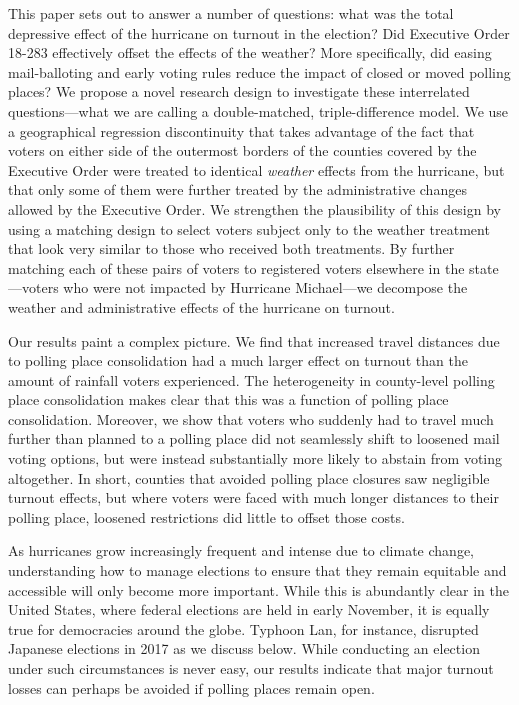 \documentclass[
  12pt,
]{article}
\begin{document}
This paper sets out to answer a number of questions: what was the total depressive effect of the hurricane on turnout in the election? Did Executive Order 18-283 effectively offset the effects of the weather? More specifically, did easing mail-balloting and early voting rules reduce the impact of closed or moved polling places? We propose a novel research design to investigate these interrelated questions---what we are calling a double-matched, triple-difference model. We use a geographical regression discontinuity that takes advantage of the fact that voters on either side of the outermost borders of the counties covered by the Executive Order were treated to identical \emph{weather} effects from the hurricane, but that only some of them were further treated by the administrative changes allowed by the Executive Order. We strengthen the plausibility of this design by using a matching design to select voters subject only to the weather treatment that look very similar to those who received both treatments. By further matching each of these pairs of voters to registered voters elsewhere in the state---voters who were not impacted by Hurricane Michael---we decompose the weather and administrative effects of the hurricane on turnout.

Our results paint a complex picture. We find that increased travel distances due to polling place consolidation had a much larger effect on turnout than the amount of rainfall voters experienced. The heterogeneity in county-level polling place consolidation makes clear that this was a function of polling place consolidation. Moreover, we show that voters who suddenly had to travel much further than planned to a polling place did not seamlessly shift to loosened mail voting options, but were instead substantially more likely to abstain from voting altogether. In short, counties that avoided polling place closures saw negligible turnout effects, but where voters were faced with much longer distances to their polling place, loosened restrictions did little to offset those costs.

As hurricanes grow increasingly frequent and intense due to climate change, understanding how to manage elections to ensure that they remain equitable and accessible will only become more important. While this is abundantly clear in the United States, where federal elections are held in early November, it is equally true for democracies around the globe. Typhoon Lan, for instance, disrupted Japanese elections in 2017 as we discuss below. While conducting an election under such circumstances is never easy, our results indicate that major turnout losses can perhaps be avoided if polling places remain open.
\end{document}

